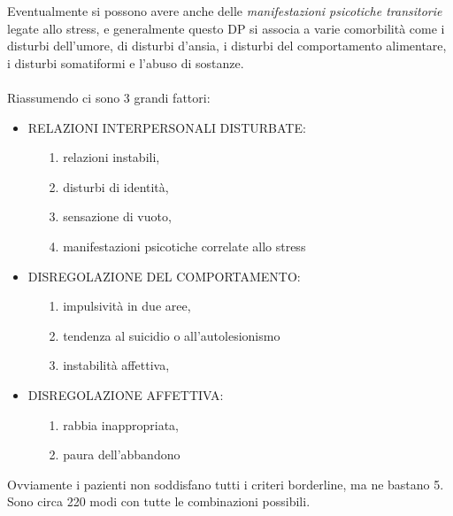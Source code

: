 Eventualmente si possono avere anche delle \emph{manifestazioni
psicotiche transitorie} legate allo stress, e generalmente questo DP si
associa a varie comorbilità come i disturbi dell'umore, di disturbi
d'ansia, i disturbi del comportamento alimentare, i disturbi somatiformi
e l'abuso di sostanze.
\\\\
Riassumendo ci sono 3 grandi fattori:

\begin{itemize}
\item
  RELAZIONI INTERPERSONALI DISTURBATE:

\begin{itemize}
\item[1.]
  relazioni instabili,
\item[2.]
  disturbi di identità,
\item[3.]
  sensazione di vuoto,
\item[4.]
  manifestazioni psicotiche correlate allo stress
\end{itemize}

\item
  DISREGOLAZIONE DEL COMPORTAMENTO:

\begin{itemize}
\item[1.]
  impulsività in due aree,
\item[2.]
  tendenza al suicidio o all'autolesionismo
\item[3.]
  instabilità affettiva,
\end{itemize}

\item
  DISREGOLAZIONE AFFETTIVA:

\begin{itemize}
\item[1.]
  rabbia inappropriata,
\item[2.]
  paura dell'abbandono
\end{itemize}
\end{itemize}

Ovviamente i pazienti non soddisfano tutti i criteri borderline, ma ne
bastano 5. Sono circa 220 modi con tutte le combinazioni possibili.

